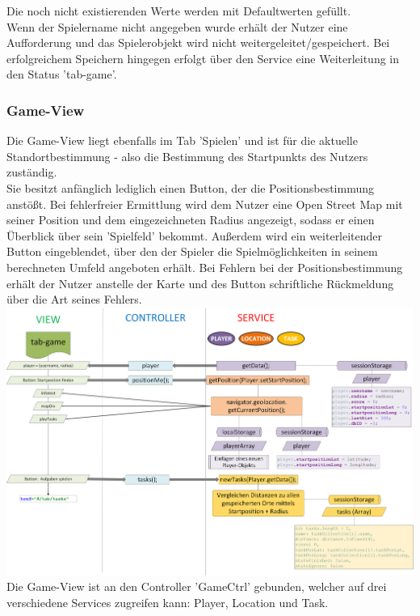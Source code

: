 Die noch nicht existierenden Werte werden mit Defaultwerten gefüllt.
\\
Wenn der Spielername nicht angegeben wurde erhält der Nutzer eine Aufforderung und das Spielerobjekt wird nicht weitergeleitet/gespeichert. Bei erfolgreichem Speichern hingegen erfolgt über den Service eine Weiterleitung in den Status 'tab-game'.

\subsubsection{Game-View}
%
%
Die Game-View liegt ebenfalls im Tab 'Spielen' und ist für die aktuelle Standortbestimmung - also die Bestimmung des Startpunkts des Nutzers zuständig.
\\
Sie besitzt anfänglich lediglich einen Button, der die Positionsbestimmung anstößt. Bei fehlerfreier Ermittlung wird dem Nutzer eine Open Street Map mit seiner Position und dem eingezeichneten Radius angezeigt, sodass er einen Überblick über sein 'Spielfeld' bekommt. Außerdem wird ein weiterleitender Button eingeblendet, über den der Spieler die Spielmöglichkeiten in seinem berechneten Umfeld angeboten erhält.
Bei Fehlern bei der Positionsbestimmung erhält der Nutzer anstelle der Karte und des Button schriftliche Rückmeldung über die Art seines Fehlers.
%
%
\\ \includegraphics[width=1\textwidth]{ref/images/03-game-tab.png} \\
%
%
Die Game-View ist an den Controller 'GameCtrl' gebunden, welcher auf drei verschiedene Services zugreifen kann: Player, Location und Task.
\\
